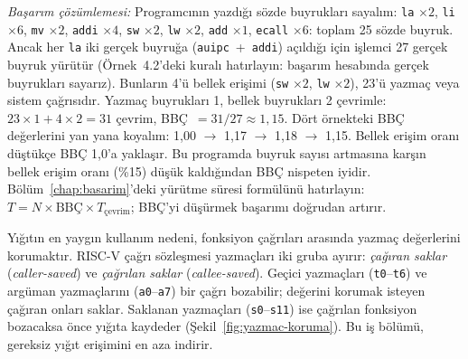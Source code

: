 \begin{ornek}[4.4]
\emph{Başarım çözümlemesi:} Programcının yazdığı sözde buyrukları sayalım: \texttt{la} $\times 2$, \texttt{li} $\times 6$, \texttt{mv} $\times 2$, \texttt{addi} $\times 4$, \texttt{sw} $\times 2$, \texttt{lw} $\times 2$, \texttt{add} $\times 1$, \texttt{ecall} $\times 6$: toplam 25 sözde buyruk. Ancak her \texttt{la} iki gerçek buyruğa (\texttt{auipc}~+~\texttt{addi}) açıldığı için işlemci 27 gerçek buyruk yürütür (Örnek~4.2'deki kuralı hatırlayın: başarım hesabında gerçek buyrukları sayarız). Bunların 4'ü bellek erişimi (\texttt{sw} $\times 2$, \texttt{lw} $\times 2$), 23'ü yazmaç veya sistem çağrısıdır. Yazmaç buyrukları 1, bellek buyrukları 2 çevrimle: $23 \times 1 + 4 \times 2 = 31$ çevrim, BBÇ~$= 31/27 \approx 1{,}15$. Dört örnekteki BBÇ değerlerini yan yana koyalım: 1{,}00 $\rightarrow$ 1{,}17 $\rightarrow$ 1{,}18 $\rightarrow$ 1{,}15. Bellek erişim oranı düştükçe BBÇ 1{,}0'a yaklaşır. Bu programda buyruk sayısı artmasına karşın bellek erişim oranı (\%15) düşük kaldığından BBÇ nispeten iyidir. Bölüm~\ref{chap:basarim}'deki yürütme süresi formülünü hatırlayın: $T = N \times \text{BBÇ} \times T_{\text{çevrim}}$; BBÇ'yi düşürmek başarımı doğrudan artırır.
\end{ornek}

Yığıtın en yaygın kullanım nedeni, fonksiyon çağrıları arasında yazmaç değerlerini korumaktır. RISC-V çağrı sözleşmesi yazmaçları iki gruba ayırır: \emph{çağıran saklar} (\emph{caller-saved}) ve \emph{çağrılan saklar} (\emph{callee-saved}). Geçici yazmaçları (\texttt{t0}--\texttt{t6}) ve argüman yazmaçlarını (\texttt{a0}--\texttt{a7}) bir çağrı bozabilir; değerini korumak isteyen çağıran onları saklar. Saklanan yazmaçları (\texttt{s0}--\texttt{s11}) ise çağrılan fonksiyon bozacaksa önce yığıta kaydeder (Şekil~\ref{fig:yazmac-koruma}). Bu iş bölümü, gereksiz yığıt erişimini en aza indirir.

